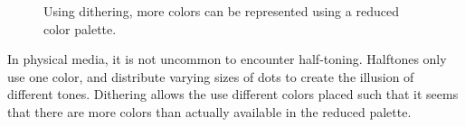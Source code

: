 \documentclass[12pt]{CPP}
\begin{document}
\begin{figure}[!hbp]
\begin{center}
\caption{Using dithering, more colors can be represented using a reduced color palette.}
\end{center}
\end{figure}

In physical media, it is not uncommon to encounter half-toning. Halftones only use one color, and distribute varying sizes of dots to create the illusion of different tones. Dithering allows the use different colors placed such that it seems that there are more colors than actually available in the reduced palette. \citep{Knuth}
\end{document}
